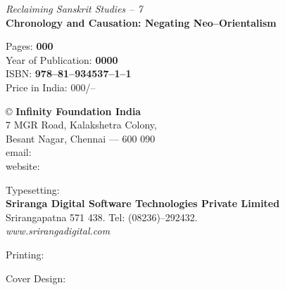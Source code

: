 \thispagestyle{empty}

\textit{Reclaiming Sanskrit Studies – 7}\\\textbf{Chronology and Causation: Negating Neo–Orientalism}

Pages: \textbf{000}\\ Year of Publication: \textbf{0000}\\ ISBN: \textbf{978–81–934537–1–1}\\ Price in India: 000/–

© \textbf{Infinity Foundation India}\\ 7 MGR Road, Kalakshetra Colony,\\ Besant Nagar, Chennai –– 600 090\\ email: \\ website: 

Typesetting:\\\textbf{Sriranga Digital Software Technologies Private Limited}\\ Srirangapatna 571 438. Tel: (08236)–292432.\\\textit{www.srirangadigital.com}

Printing: 

Cover Design:

